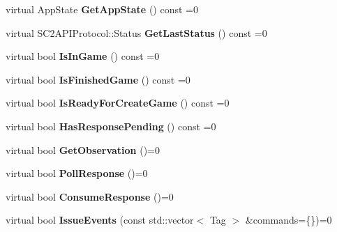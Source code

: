 \begin{DoxyCompactItemize}
virtual App\+State {\bfseries Get\+App\+State} () const =0
\item 
\mbox{\label{classsc2_1_1_control_interface_a9cb258851dc5ab3ac7abe7bd817c9531}} 
virtual S\+C2\+A\+P\+I\+Protocol\+::\+Status {\bfseries Get\+Last\+Status} () const =0
\item 
\mbox{\label{classsc2_1_1_control_interface_a334adf0a34284e32833554fa189d9746}} 
virtual bool {\bfseries Is\+In\+Game} () const =0
\item 
\mbox{\label{classsc2_1_1_control_interface_a8b00eb5fe681665c39855cc3b481ed92}} 
virtual bool {\bfseries Is\+Finished\+Game} () const =0
\item 
\mbox{\label{classsc2_1_1_control_interface_a4bc92e6d97dbe3bd91c93bdf4a450155}} 
virtual bool {\bfseries Is\+Ready\+For\+Create\+Game} () const =0
\item 
\mbox{\label{classsc2_1_1_control_interface_a470cbcfd519ee228c024a9b59a9bbb74}} 
virtual bool {\bfseries Has\+Response\+Pending} () const =0
\item 
\mbox{\label{classsc2_1_1_control_interface_a4c66296192ffa3e1ba8c3ad2a17d8380}} 
virtual bool {\bfseries Get\+Observation} ()=0
\item 
\mbox{\label{classsc2_1_1_control_interface_aa6f27ad05d20d610c2d4e5b70fc68b49}} 
virtual bool {\bfseries Poll\+Response} ()=0
\item 
\mbox{\label{classsc2_1_1_control_interface_aa8bb71f36fd5106eb21bbceb1ecedf4d}} 
virtual bool {\bfseries Consume\+Response} ()=0
\item 
\mbox{\label{classsc2_1_1_control_interface_a03c1b68afb1521abf804d2a120f91880}} 
virtual bool {\bfseries Issue\+Events} (const std\+::vector$<$ Tag $>$ \&commands=\{\})=0
\item 
\mbox{\label{classsc2_1_1_control_interface_a251ee28b1676960c086dc748c52723a3}} 

\end{DoxyCompactItemize}

